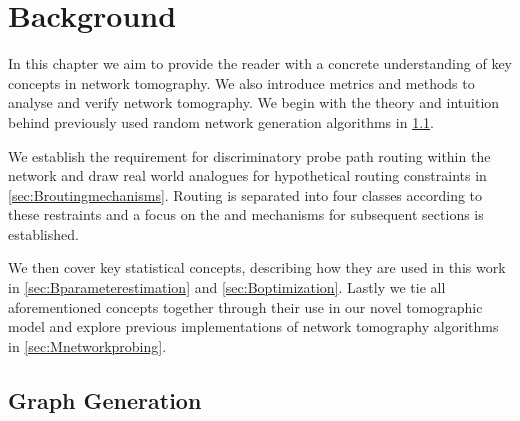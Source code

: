 \chapter{Background}
\label{cha:background}

In this chapter we aim to provide the reader with a concrete understanding of key concepts in network tomography. We also introduce metrics and methods to analyse and verify network tomography. We begin with the theory and intuition behind previously used random network generation algorithms in \cref{sec:Bgraphgeneration}.\par
We establish the requirement for discriminatory probe path routing within the network and draw real world analogues for hypothetical routing constraints in \cref{sec:Broutingmechanisms}. Routing is separated into four classes according to these restraints and a focus on the \cbr and \cfr mechanisms for subsequent sections is established.\par
We then cover key statistical concepts, describing how they are used in this work in \cref{sec:Bparameterestimation} and \cref{sec:Boptimization}. Lastly we tie all aforementioned concepts together through their use in our novel tomographic model and explore previous implementations of network tomography algorithms in \cref{sec:Mnetworkprobing}.

\section{Graph Generation}
\label{sec:Bgraphgeneration}

